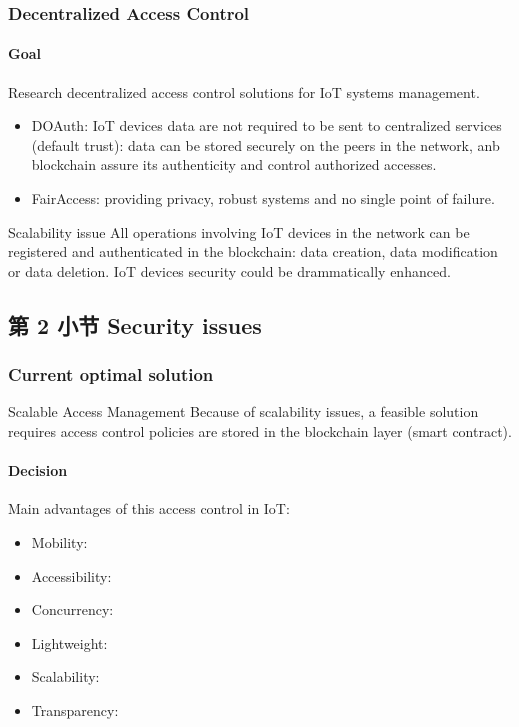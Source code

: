 \documentclass[
    aspectratio=169,                   %
]{beamer}
\begin{document}
    \begin{frame}
        \frametitle{Decentralized Access Control}
        
        \paragraph{Goal} Research decentralized access control solutions for IoT systems management.\cite{ouaddah}

        \begin{itemize}
            \item \alert{DOAuth}: IoT devices data are not required to be sent to centralized services (default trust): data can be stored securely on the peers in the network, anb blockchain assure its authenticity and control authorized accesses.
            \item \alert{FairAccess}: providing privacy, robust systems and no single point of failure.
        \end{itemize}

        \begin{block}{Scalability issue}
            All operations involving IoT devices in the network can be registered and authenticated in the blockchain: data creation, data modification or data deletion. IoT devices security could be drammatically enhanced.
        \end{block}
    \end{frame}

\subsection{第 2 小节 Security issues}

    \begin{frame}
        \frametitle{Current optimal solution}
        
        \begin{block}{Scalable Access Management}
            Because of scalability issues, a feasible solution requires access control policies are stored in the blockchain layer (smart contract).\cite{novo}
        \end{block}

        \paragraph{Decision} Main advantages of this access control in IoT:

        \begin{itemize}
            \item \alert{Mobility}: 
            \item \alert{Accessibility}: 
            \item \alert{Concurrency}: 
            \item \alert{Lightweight}: 
            \item \alert{Scalability}: 
            \item \alert{Transparency}: 
        \end{itemize}
    \end{frame}
\end{document}
